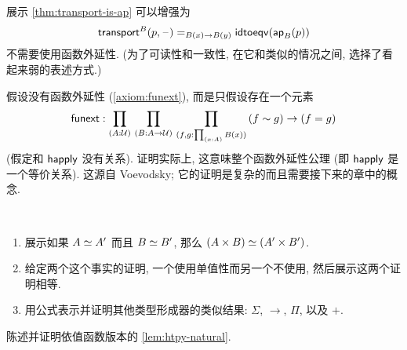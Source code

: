 \begin{ex}
    \label{ex:strengthen-transport-is-ap}
    展示 \cref{thm:transport-is-ap} 可以增强为
    \[\mathsf{transport}^{B}(p,{\mathord{\hspace{1pt}\text{--}\hspace{1pt}}}) =_{B(x)\to B(y)} \mathsf{idtoeqv}(\mathsf{ap}_{B}(p))\]
    不需要使用函数外延性.
    (为了可读性和一致性, 在它和类似的情况之间, 选择了看起来弱的表述方式.)
\end{ex}

\begin{ex}
    \label{ex:strong-from-weak-funext}
    假设没有函数外延性 (\cref{axiom:funext}), 而是只假设存在一个元素
    \[ \funext : \prd{A:\UU}{B:A\to \UU}{f,g:\prd{x:A} B(x)} (f\htpy g) \to (f=g) \]
    (假定和 $\mathsf{happly}$ 没有关系).
    证明实际上, 这意味整个函数外延性公理 (即 $\mathsf{happly}$ 是一个等价关系).
    这源自 Voevodsky; 它的证明是复杂的而且需要接下来的章中的概念.
\end{ex}

\begin{ex}
    \label{ex:equiv-functor-types}\
    \begin{enumerate}
        \item 展示如果 $A \simeq A'$  而且 $B \simeq B'$, 那么 $(A\times B) \simeq (A'\times B')$.
        \item 给定两个这个事实的证明, 一个使用单值性而另一个不使用, 然后展示这两个证明相等.
        \item 用公式表示并证明其他类型形成器的类似结果: $\Sigma$, $\to$, $\Pi$, 以及 $+$.
    \end{enumerate}
\end{ex}

\begin{ex}
    \label{ex:dep-htpy-natural}
    陈述并证明依值函数版本的 \cref{lem:htpy-natural}.
\end{ex}